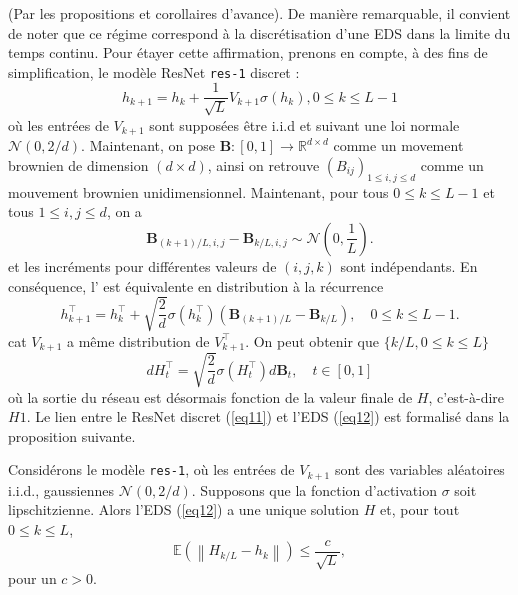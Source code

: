 (Par les propositions et corollaires d'avance). De manière remarquable, il convient de noter que ce régime correspond à la discrétisation d'une EDS dans la limite du temps continu. Pour étayer cette affirmation, prenons en compte, à des fins de simplification, le modèle ResNet \texttt{res-1} discret :
\begin{equation}\label{eq11}
    h_{k+1} = h_k + \frac{1}{\sqrt{L}}V_{k+1}\sigma(h_k) , 0 \leqslant k \leqslant L-1 
\end{equation}
où les entrées de $V_{k+1}$ sont supposées être i.i.d et suivant une loi normale $\mathcal{N}(0,2/d)$.
Maintenant, on pose $\mathbf{B}:[0,1] \rightarrow \mathbb{R}^{d \times d}$ comme un movement brownien de dimension $ (d \times d) $, ainsi on retrouve $\left(B_{i j}\right)_{1 \leqslant i, j \leqslant d}$ comme un mouvement brownien unidimensionnel. Maintenant, pour tous $0 \leqslant k \leqslant L-1$ et tous $1 \leqslant i, j \leqslant d$, on a
$$
    \mathbf{B}_{(k+1) / L, i, j}-\mathbf{B}_{k / L, i, j} \sim \mathcal{N}\left(0, \frac{1}{L}\right).
$$
et les incréments pour différentes valeurs de $(i, j, k)$ sont indépendants. En conséquence, l' est équivalente en distribution à la récurrence
$$
    h_{k+1}^{\top}=h_k^{\top}+\sqrt{\frac{2}{d}} \sigma\left(h_k^{\top}\right)\left(\mathbf{B}_{(k+1) / L}-\mathbf{B}_{k / L}\right), \quad 0 \leqslant k \leqslant L-1 .
$$
cat $V_{k+1}$ a même distribution de $V_{k+1}^{\top}$. On peut obtenir que $\{k / L, 0 \leqslant k \leqslant L\}$ 
\begin{equation}\label{eq12}
    d H_t^{\top}=\sqrt{\frac{2}{d}} \sigma\left(H_t^{\top}\right) d \mathbf{B}_t, \quad t \in[0,1]
\end{equation}
où la sortie du réseau est désormais fonction de la valeur finale de $H$, c'est-à-dire $H1$. Le lien entre le ResNet discret (\ref{eq11}) et l'EDS (\ref{eq12}) est formalisé dans la proposition suivante.

\begin{proposition}\label{prop10}
Considérons le modèle \texttt{res-1}, où les entrées de $V_{k+1}$ sont des variables aléatoires i.i.d., gaussiennes $\mathcal{N}(0,2 / d)$. Supposons que la fonction d'activation $\sigma$ soit lipschitzienne. Alors l'EDS (\ref{eq12}) a une unique solution $H$ et, pour tout $0 \leqslant k \leqslant L$,
$$
    \mathbb{E}\left(\left\|H_{k / L}-h_k\right\|\right) \leqslant \frac{c}{\sqrt{L}},
$$
pour un $c>0$.
\end{proposition}


